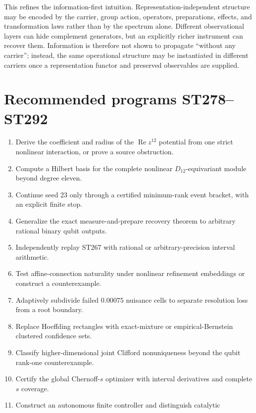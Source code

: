 \documentclass[11pt,a4paper]{article}
\begin{document}
This refines the information-first intuition. Representation-independent structure may be
encoded by the carrier, group action, operators, preparations, effects, and transformation
laws rather than by the spectrum alone. Different observational layers can hide complement
generators, but an explicitly richer instrument can recover them. Information is therefore
not shown to propagate ``without any carrier''; instead, the same operational structure may
be instantiated in different carriers once a representation functor and preserved
observables are supplied.

\section{Recommended programs ST278--ST292}

\begin{enumerate}
\item[\textbf{ST278}.] Derive the coefficient and radius of the
$\operatorname{Re}z^{12}$ potential from one strict nonlinear interaction, or prove a source
obstruction.
\item[\textbf{ST279}.] Compute a Hilbert basis for the complete nonlinear
$D_{12}$-equivariant module beyond degree eleven.
\item[\textbf{ST280}.] Continue seed 23 only through a certified minimum-rank event bracket,
with an explicit finite stop.
\item[\textbf{ST281}.] Generalize the exact measure-and-prepare recovery theorem to arbitrary
rational binary qubit outputs.
\item[\textbf{ST282}.] Independently replay ST267 with rational or arbitrary-precision
interval arithmetic.
\item[\textbf{ST283}.] Test affine-connection naturality under nonlinear refinement
embeddings or construct a counterexample.
\item[\textbf{ST284}.] Adaptively subdivide failed $0.00075$ nuisance cells to separate
resolution loss from a root boundary.
\item[\textbf{ST285}.] Replace Hoeffding rectangles with exact-mixture or empirical-Bernstein
clustered confidence sets.
\item[\textbf{ST286}.] Classify higher-dimensional joint Clifford nonuniqueness beyond the
qubit rank-one counterexample.
\item[\textbf{ST287}.] Certify the global Chernoff-$s$ optimizer with interval derivatives
and complete $s$ coverage.
\item[\textbf{ST288}.] Construct an autonomous finite controller and distinguish catalytic

\end{enumerate}
\end{document}

